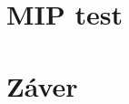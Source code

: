 \documentclass[10pt,twoside,slovak,a4paper]{article}
\begin{document}
\section{MIP test}

\section{Záver} \label{zaver} %





\nocite{*}

\end{document}
